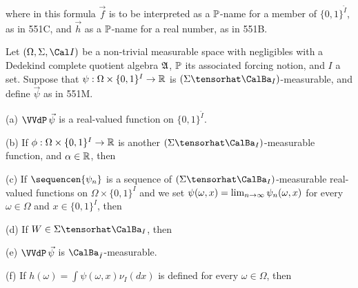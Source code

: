\noindent where in this formula $\vec f$ is to be interpreted as a
$\Bbb P$-name for a member of $\{0,1\}^{\check I}$, as in 551C, and
$\vec h$ as a $\Bbb P$-name for a real number, as in 551B.

 Let $(\Omega,\Sigma,\Cal I)$ be a non-trivial
measurable space with negligibles with a Dedekind complete quotient
algebra $\frak A$, $\Bbb P$ its associated forcing
notion, and $I$ a set.   Suppose that
$\psi:\Omega\times\{0,1\}^I\to\Bbb R$ is
$(\Sigma\tensorhat\CalBa_I)$-measurable, and define $\vec\psi$ as in 551M.

(a) $\VVdP\,\vec\psi$ is a real-valued
function on $\{0,1\}^{\check I}$.

(b) If $\phi:\Omega\times\{0,1\}^I\to\Bbb R$ is another
$(\Sigma\tensorhat\CalBa_I)$-measurable function, and $\alpha\in\Bbb R$,
then


(c) If $\sequencen{\psi_n}$ is a sequence of
$(\Sigma\tensorhat\CalBa_I)$-measurable real-valued functions on
$\Omega\times\{0,1\}^I$ and
\ifnum{} we set \fi
$\psi(\omega,x)=\penalty-100\lim_{n\to\infty}\psi_n(\omega,x)$ for every
$\omega\in\Omega$ and $x\in\{0,1\}^I$, then


(d) If $W\in\Sigma\tensorhat\CalBa_I$, then


(e) $\VVdP\,\vec\psi$ is $\CalBa_{\check I}$-measurable.

(f) If $h(\omega)=\int\psi(\omega,x)\nu_I(dx)$ is defined for every
$\omega\in\Omega$, then


